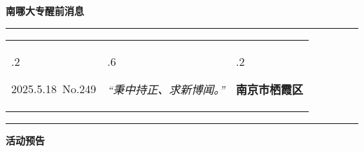 \documentclass[letterpaper, 12pt]{article}
\begin{document}
\begin{center}
    \Huge\textbf{南哪大专醒前消息}
\end{center}
\vspace{4mm}
\hrule
\renewcommand\tabularxcolumn[1]{m{#1}}
\begin{tabularx}{\textwidth}{>{\hsize.2\hsize}X>{\hsize.6\hsize}X>{\hsize.2\hsize}X}
    \begin{flushleft}
        2025.5.18\, No.249
    \end{flushleft}
    &
    \begin{center}
        \textit{“秉中持正、求新博闻。”}
    \end{center}
    &
    \begin{flushright}
        \textbf{南京市栖霞区}
    \end{flushright}
\end{tabularx}
\vspace{-3.5mm}
\hrule
\vspace{4mm}
\centerline{\huge\textbf{活动预告}}
\end{document}

